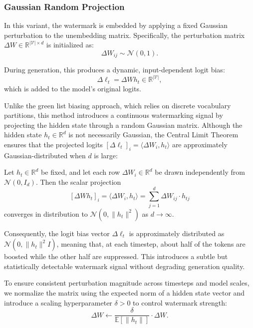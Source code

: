 \subsubsection{Gaussian Random Projection}

In this variant, the watermark is embedded by applying a fixed Gaussian perturbation to the unembedding matrix. Specifically, the perturbation matrix \( \Delta W \in \mathbb{R}^{|\mathcal{V}| \times d} \) is initialized as:
\begin{equation}
    \Delta W_{ij} \sim \mathcal{N}(0, 1).
\end{equation}

During generation, this produces a dynamic, input-dependent logit bias:
\[
\Delta \ell_t = \Delta W h_t \in \mathbb{R}^{|\mathcal{V}|},
\]
which is added to the model’s original logits.

Unlike the green list biasing approach, which relies on discrete vocabulary partitions, this method introduces a continuous watermarking signal by projecting the hidden state through a random Gaussian matrix. Although the hidden state \( h_t \in \mathbb{R}^d \) is not necessarily Gaussian, the Central Limit Theorem ensures that the projected logits \( [\Delta \ell_t]_i = \langle \Delta W_i, h_t \rangle \) are approximately Gaussian-distributed when \( d \) is large:

\begin{theorem}
    Let \( h_t \in \mathbb{R}^d \) be fixed, and let each row \( \Delta W_i \in \mathbb{R}^d \) be drawn independently from \( \mathcal{N}(0, I_d) \). Then the scalar projection
    \[
        [\Delta W h_t]_i = \langle \Delta W_i, h_t \rangle = \sum_{j=1}^d \Delta W_{ij} \cdot h_{tj}
    \]
    converges in distribution to \( \mathcal{N}(0, \|h_t\|^2) \) as \( d \to \infty \).
\end{theorem}

Consequently, the logit bias vector \( \Delta \ell_t \) is approximately distributed as \( \mathcal{N}(0, \|h_t\|^2 I) \), meaning that, at each timestep, about half of the tokens are boosted while the other half are suppressed. This introduces a subtle but statistically detectable watermark signal without degrading generation quality.

To ensure consistent perturbation magnitude across timesteps and model scales, we normalize the matrix using the expected norm of a hidden state vector and introduce a scaling hyperparameter \( \delta > 0 \) to control watermark strength:
\begin{equation}
    \Delta W \leftarrow \frac{\delta}{\mathbb{E}[\|h_t\|]} \cdot \Delta W.
\end{equation}

